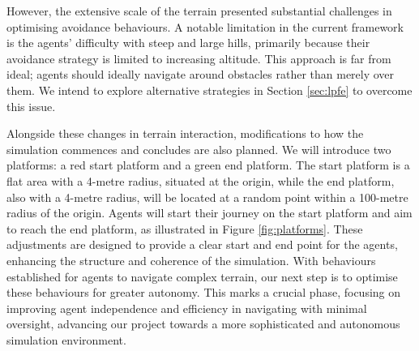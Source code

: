 \documentclass[12pt]{article}
\begin{document}
However, the extensive scale of the terrain presented substantial challenges in optimising avoidance behaviours. A notable limitation in the current framework is the agents' difficulty with steep and large hills, primarily because their avoidance strategy is limited to increasing altitude. This approach is far from ideal; agents should ideally navigate around obstacles rather than merely over them. We intend to explore alternative strategies in Section \ref{sec:lpfe} to overcome this issue.

Alongside these changes in terrain interaction, modifications to how the simulation commences and concludes are also planned. We will introduce two platforms: a red start platform and a green end platform. The start platform is a flat area with a 4-metre radius, situated at the origin, while the end platform, also with a 4-metre radius, will be located at a random point within a 100-metre radius of the origin. Agents will start their journey on the start platform and aim to reach the end platform, as illustrated in Figure \ref{fig:platforms}. These adjustments are designed to provide a clear start and end point for the agents, enhancing the structure and coherence of the simulation. With behaviours established for agents to navigate complex terrain, our next step is to optimise these behaviours for greater autonomy. This marks a crucial phase, focusing on improving agent independence and efficiency in navigating with minimal oversight, advancing our project towards a more sophisticated and autonomous simulation environment.
\end{document}
